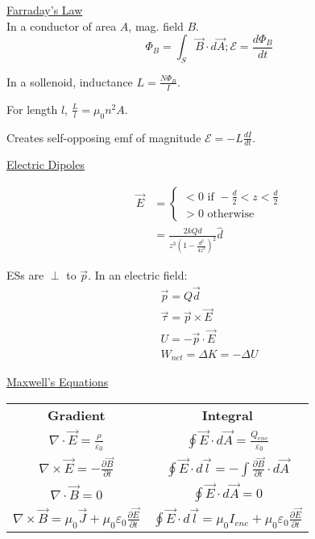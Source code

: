 \documentclass[8pt]{minimal}
\begin{document}
\underline{Farraday's Law}\\
In a conductor of area $A$, mag. field $B$.
\[ \Phi_B = \int_S \vec{B} \cdot d\vec{A}; \mathcal{E} = \frac{d \Phi_B}{d t} \]

In a sollenoid, inductance $L = \frac{N\Phi_B}{I}$. 

For length $l$, $\frac{L}{l} = \mu_0 n^2 A$.

Creates self-opposing emf of magnitude $\mathcal{E} = -L \frac{dI}{dt}$.

\underline{Electric Dipoles}

\begin{align*}
    \vec{E} &= \left\{ \begin{matrix}
        < 0 \text{ if } -\frac{d}{2} < z < \frac{d}{2}\\
        > 0 \text{ otherwise}
    \end{matrix} \right.\\
        &=  \frac{2kQd}{z^3\left(1 - \frac{d^2}{4z^2}\right)^2}\hat{d}
\end{align*}

ESs are $\perp$ to $\vec{p}$.
In an electric field:
\begin{gather*}
    \vec{p} = Q\vec{d}\\
    \vec{\tau} = \vec{p} \times \vec{E}\\
    U = -\vec{p} \cdot \vec{E}\\
    W_{net} = \Delta K = -\Delta U
\end{gather*}


\underline{Maxwell's Equations}
\begin{center}
    \begin{tabular}[width=\textwidth]{ |c|c| }
        \textbf{Gradient}   &\textbf{Integral}\\
        $\nabla \cdot \vec{E} = \frac{\rho}{\varepsilon_0}$  &$\oint \vec{E} \cdot d\vec{A} = \frac{Q_{enc}}{\varepsilon_0}$\\
        $\nabla \times \vec{E} = -\frac{\partial \vec{B}}{\partial t}$  &$\oint \vec{E} \cdot d\vec{l} = -\int \frac{\partial \vec{B}}{\partial t} \cdot d\vec{A}$\\
        $\nabla \cdot \vec{B} = 0$  &$\oint \vec{E} \cdot d\vec{A} = 0$\\
        $\nabla \times \vec{B} = \mu_0 \vec{J} + \mu_0 \varepsilon_0 \frac{\partial \vec{E}}{\partial t}$  &$\oint \vec{E} \cdot d\vec{l} = \mu_0 I_{enc} + \mu_0 \varepsilon_0 \frac{\partial \vec{E}}{\partial t}$
    \end{tabular}
\end{center}

\end{document}
